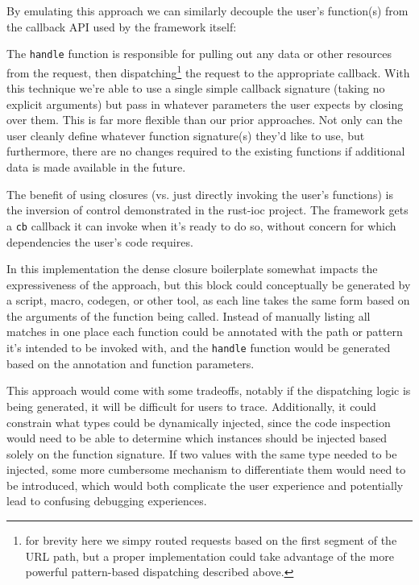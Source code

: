 \documentclass[sigconf]{acmart}
\def\code#1{\lstinline{#1}}
\begin{document}
By emulating this approach we can similarly decouple the user's function(s) from the callback API used by the framework itself:

\begin{minipage}{\linewidth}

\end{minipage}

The \code{handle} function is responsible for pulling out any data or other resources from the request, then dispatching\footnote{for brevity here we simpy routed requests based on the first segment of the URL path, but a proper implementation could take advantage of the more powerful pattern-based dispatching described above.} the request to the appropriate callback. With this technique we're able to use a single simple callback signature (taking no explicit arguments) but pass in whatever parameters the user expects by closing over them. This is far more flexible than our prior approaches. Not only can the user cleanly define whatever function signature(s) they'd like to use, but furthermore, there are no changes required to the existing functions if additional data is made available in the future.

The benefit of using closures (vs. just directly invoking the user's functions) is the inversion of control demonstrated in the rust-ioc project. The framework gets a \code{cb} callback it can invoke when it's ready to do so, without concern for which dependencies the user's code requires.

In this implementation the dense closure boilerplate somewhat impacts the expressiveness of the approach, but this block could conceptually be generated by a script, macro, codegen, or other tool, as each line takes the same form based on the arguments of the function being called. Instead of manually listing all matches in one place each function could be annotated with the path or pattern it's intended to be invoked with, and the \code{handle} function would be generated based on the annotation and function parameters.

This approach would come with some tradeoffs, notably if the dispatching logic is being generated, it will be difficult for users to trace. Additionally, it could constrain what types could be dynamically injected, since the code inspection would need to be able to determine which instances should be injected based solely on the function signature. If two values with the same type needed to be injected, some more cumbersome mechanism to differentiate them would need to be introduced, which would both complicate the user experience and potentially lead to confusing debugging experiences.
\end{document}
